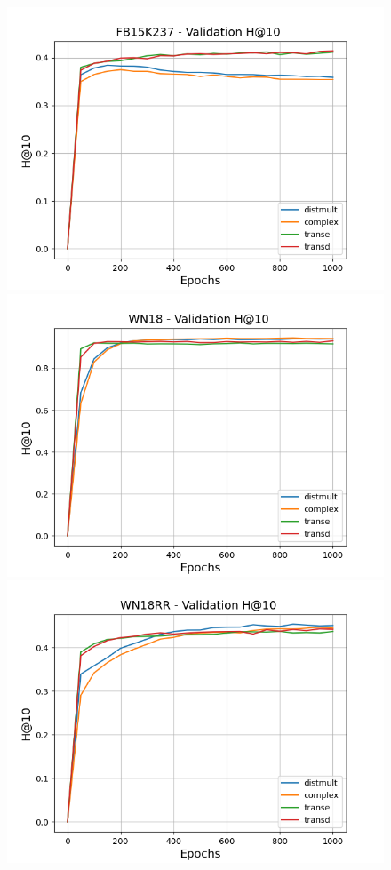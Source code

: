 \begin{figure}
    \begin{minipage}{.3\textwidth}
      \centering
      \includegraphics[width=\linewidth]{figures/results/pretrain/fb15k237/pretrain_fb15k237_hit10s.png}
    \end{minipage}%
     \begin{minipage}{.3\textwidth}
      \centering
      \includegraphics[width=0.9\linewidth]{figures/results/pretrain/wn18/pretrain_wn18_hit10s.png}
    \end{minipage}%
     \begin{minipage}{.3\textwidth}
      \centering
      \includegraphics[width=0.9\linewidth]{figures/results/pretrain/wn18rr/pretrain_wn18rr_hit10s.png}

\end{minipage}
\end{figure}
